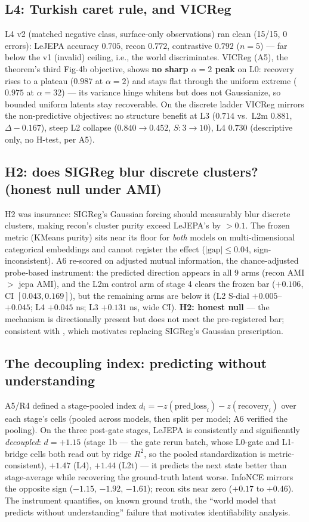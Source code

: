 \documentclass[10pt]{article}
\begin{document}
\subsection{L4: Turkish caret rule, and VICReg}
\label{sec:l4}
L4 v2 (matched negative class, surface-only observations) ran clean
(15/15, 0 errors): LeJEPA accuracy $0.705$, recon $0.772$, contrastive
$0.792$ ($n{=}5$) --- far below the v1 (invalid) ceiling, i.e., the world
discriminates. VICReg (A5), the theorem's third Fig-4b objective, shows
\textbf{no sharp $\alpha{=}2$ peak} on L0: recovery rises to a plateau
($0.987$ at $\alpha{=}2$) and stays flat through the uniform extreme ($0.975$
at $\alpha{=}32$) --- its variance hinge whitens but does not Gaussianize, so
bounded uniform latents stay recoverable. On the discrete ladder VICReg
mirrors the non-predictive objectives: no structure benefit at L3 ($0.714$ vs.\
L2m $0.881$, $\Delta{-}0.167$), steep L2 collapse ($0.840\to0.452$,
$S{:}3\to10$), L4 $0.730$ (descriptive only, no H-test, per A5).

\subsection{H2: does SIGReg blur discrete clusters? (honest null under AMI)}
\label{sec:h2}
H2 was insurance: SIGReg's Gaussian forcing should measurably blur discrete
clusters, making recon's cluster purity exceed LeJEPA's by $>0.1$. The frozen
metric (KMeans purity) sits near its floor for \emph{both} models on
multi-dimensional categorical embeddings and cannot register the effect
($|\text{gap}| \le 0.04$, sign-inconsistent). A6 re-scored on adjusted mutual
information, the chance-adjusted probe-based instrument: the predicted
direction appears in all 9 arms (recon AMI $>$ jepa AMI), and the L2m control
arm of stage 4 clears the frozen bar ($+0.106$, CI $[0.043,0.169]$), but the
remaining arms are below it (L2 S-dial $+0.005$--$+0.045$; L4 $+0.045$ ns; L3
$+0.131$ ns, wide CI). \textbf{H2: honest null} --- the mechanism is
directionally present but does not meet the pre-registered bar; consistent
with \citet{nogaussian2026}, which motivates replacing SIGReg's Gaussian
prescription.

\subsection{The decoupling index: predicting without understanding}
\label{sec:decoupling}
A5/R4 defined a stage-pooled index $d_i = -z(\text{pred\_loss}_i) -
z(\text{recovery}_i)$ over each stage's cells (pooled across models, then
split per model; A6 verified the pooling). On the three post-gate stages,
LeJEPA is consistently and significantly \emph{decoupled}:
$d = +1.15$ (stage 1b --- the gate rerun batch, whose L0-gate and L1-bridge
cells both read out by ridge $R^2$, so the pooled standardization is
metric-consistent), $+1.47$ (L4), $+1.44$ (L2t) --- it predicts the next
state better than stage-average while recovering the ground-truth latent worse.
InfoNCE mirrors the opposite sign ($-1.15$, $-1.92$, $-1.61$); recon sits near
zero ($+0.17$ to $+0.46$). The instrument quantifies, on known ground truth,
the ``world model that predicts without understanding'' failure that
motivates identifiability analysis.
\end{document}
